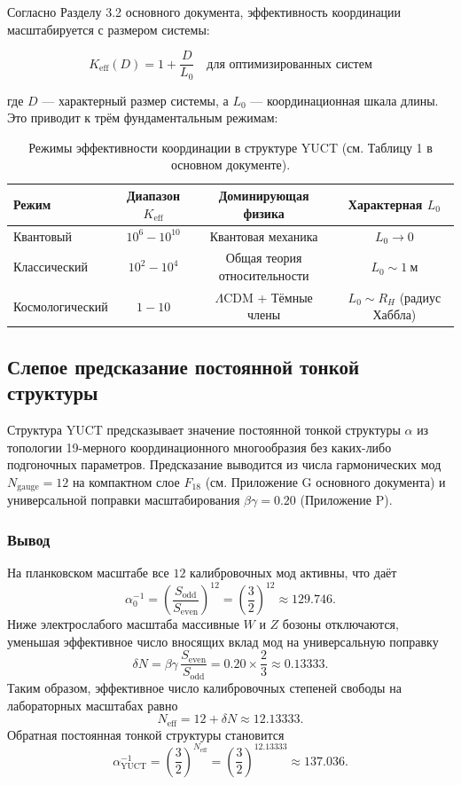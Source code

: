 \documentclass[12pt,a4paper]{article}
\theoremstyle{remark}
\newcommand{\Keff}{K_{\mathrm{eff}}}
\begin{document}
	Согласно Разделу 3.2 основного документа, эффективность координации масштабируется с размером системы:
	
	\begin{equation}
		\Keff(D) = 1 + \frac{D}{L_0} \quad \text{для оптимизированных систем}
	\end{equation}
	
	где $D$ — характерный размер системы, а $L_0$ — координационная шкала длины. Это приводит к трём фундаментальным режимам:
	
	\begin{table}[htbp]
		\centering
		\begin{tabular}{lccc}
			\toprule
			\textbf{Режим} & \textbf{Диапазон $\Keff$} & \textbf{Доминирующая физика} & \textbf{Характерная $L_0$} \\
			\midrule
			Квантовый & $10^6 - 10^{10}$ & Квантовая механика & $L_0 \to 0$ \\
			Классический & $10^2 - 10^4$ & Общая теория относительности & $L_0 \sim 1\ \text{м}$ \\
			Космологический & $1 - 10$ & $\Lambda$CDM + Тёмные члены & $L_0 \sim R_H$ (радиус Хаббла) \\
			\bottomrule
		\end{tabular}
		\caption{Режимы эффективности координации в структуре YUCT (см. Таблицу 1 в основном документе).}
		\label{tab:keff-regimes}
	\end{table}
	
	\subsection{Слепое предсказание постоянной тонкой структуры}
	\label{subsec:blind_alpha}
	
	Структура YUCT предсказывает значение постоянной тонкой структуры $\alpha$ из топологии 19-мерного координационного многообразия без каких-либо подгоночных параметров. Предсказание выводится из числа гармонических мод $N_{\mathrm{gauge}} = 12$ на компактном слое $F_{18}$ (см. Приложение G основного документа) и универсальной поправки масштабирования $\beta\gamma = 0.20$ (Приложение P).
	
	\subsubsection{Вывод}
	
	На планковском масштабе все $12$ калибровочных мод активны, что даёт
	\[
	\alpha_0^{-1} = \left(\frac{S_{\mathrm{odd}}}{S_{\mathrm{even}}}\right)^{12}
	= \left(\frac{3}{2}\right)^{12} \approx 129.746 .
	\]
	Ниже электрослабого масштаба массивные $W$ и $Z$ бозоны отключаются, уменьшая эффективное число вносящих вклад мод на универсальную поправку
	\[
	\delta N = \beta\gamma \, \frac{S_{\mathrm{even}}}{S_{\mathrm{odd}}}
	= 0.20 \times \frac{2}{3} \approx 0.13333 .
	\]
	Таким образом, эффективное число калибровочных степеней свободы на лабораторных масштабах равно
	\[
	N_{\mathrm{eff}} = 12 + \delta N \approx 12.13333 .
	\]
	Обратная постоянная тонкой структуры становится
	\[
	\boxed{\alpha^{-1}_{\mathrm{YUCT}} = \left(\frac{3}{2}\right)^{N_{\mathrm{eff}}}
		= \left(\frac{3}{2}\right)^{12.13333} \approx 137.036 } .
	\]
	
\end{document}
